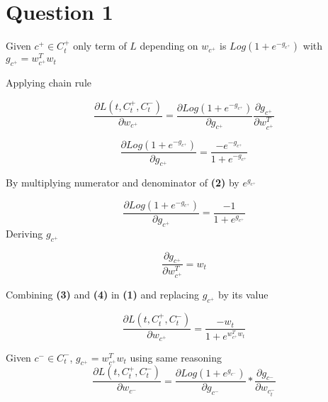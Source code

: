 \documentclass[a4paper]{article}
\begin{document}



\section{Question 1}
Given $c^{+} \in C^{+}_{t}$ only term of $L$ depending on $w_{c^{+}}$  is $Log(1 + e^{-g_{c^{+}}})$ with $g_{c^{+}} = w_{c^{+}}^{T}w_{t}$

Applying chain rule


\begin{equation}
    \frac{\partial L(t, C_{t}^{+},C_{t}^{-})}{\partial w_{c^{+}}}=
    \frac{\partial Log(1 + e^{-g_{c^{+}}})}{\partial g_{c^{+}}}\frac{\partial g_{c^{+}}}{\partial w_{c^{+}}^{T}}
\end{equation}

\begin{equation}
    \frac{\partial Log(1 + e^{-g_{c^{+}}})}{\partial g_{c^{+}}}= \frac{-e^{- g_{c^{+}}}}{1+e^{- g_{c^{+}}}}
\end{equation}

By multiplying numerator and denominator of \textbf{(2)} by $e^{g_{c^{+}}}$

\begin{equation}
    \frac{\partial Log(1 + e^{-g_{c^{+}}})}{\partial g_{c^{+}}} = \frac{-1}{1 + e^{g_{c^{+}}}}
\end{equation}
Deriving $g_{c^{+}}$

\begin{equation}
\frac{\partial g_{c^{+}}}{\partial w_{c^{+}}^{T}}=w_{t}
\end{equation}

Combining \textbf{(3)} and \textbf{(4)} in \textbf{(1)} and replacing $g_{c^{+}}$ by its value

\begin{equation}
\boxed{
\frac{\partial L(t, C_{t}^{+},C_{t}^{-})}{\partial w_{c^{+}}}=\frac{-w_{t}}{1 + e^{w_{c^{+}}^{T}w_{t}}}
}
\end{equation}

Given $ c^{-} \in C^{-}_{t}$, $ g_{c^{+}} = w_{c^{+}}^{T}w_{t}$ using same reasoning
\begin{equation}
\frac{\partial L(t, C_{t}^{+},C_{t}^{-})}{\partial w_{c^{-}}}=
    \frac{\partial Log(1 + e^{g_{c^{-}}})}{\partial g_{c^{-}}}
*
\frac{\partial g_{c^{-}}}{\partial w_{c^{-}_{t}}}
\end{equation}
\end{document}
